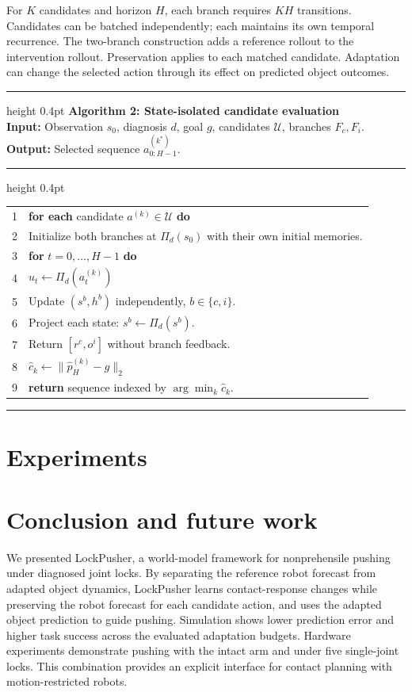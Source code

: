 \documentclass[conference]{IEEEtran}
\begin{document}
For $K$ candidates and horizon $H$, each branch requires $KH$ transitions. Candidates can be batched independently; each maintains its own temporal recurrence. The two-branch construction adds a reference rollout to the intervention rollout. Preservation applies to each matched candidate. Adaptation can change the selected action through its effect on predicted object outcomes.


\par\smallskip\noindent
\begin{minipage}{\linewidth}
\hrule height 0.4pt\smallskip
\textbf{Algorithm 2: State-isolated candidate evaluation}\label{alg:rollout}\\
\textbf{Input:} Observation $s_0$, diagnosis $d$, goal $g$, candidates $\mathcal U$, branches $F_c,F_i$.\\
\textbf{Output:} Selected sequence $a^{(k^*)}_{0:H-1}$.
\smallskip\hrule height 0.4pt\smallskip
\begin{tabular}{@{}r@{\quad}p{.87\linewidth}@{}}
1 & \textbf{for each} candidate $a^{(k)}\in\mathcal U$ \textbf{do}\\
2 & \quad Initialize both branches at $\Pi_d(s_0)$ with their own initial memories.\\
3 & \quad \textbf{for} $t=0,\ldots,H-1$ \textbf{do}\\
4 & \qquad $u_t\leftarrow\Pi_d(a_t^{(k)})$\\
5 & \qquad Update $(s^b,h^b)$ independently, $b\in\{c,i\}$.\\
6 & \qquad Project each state: $s^b\leftarrow\Pi_d(s^b)$.\\
7 & \qquad Return $[r^c,o^i]$ without branch feedback.\\
8 & \quad $\hat c_k\leftarrow\|\hat p_H^{(k)}-g\|_2$\\
9 & \textbf{return} sequence indexed by $\arg\min_k\hat c_k$.
\end{tabular}
\smallskip\hrule
\end{minipage}
\par\smallskip

\section{Experiments}
\label{sec:experiments}



\section{Conclusion and future work}
We presented LockPusher, a world-model framework for nonprehensile pushing under diagnosed joint locks. By separating the reference robot forecast from adapted object dynamics, LockPusher learns contact-response changes while preserving the robot forecast for each candidate action, and uses the adapted object prediction to guide pushing. Simulation shows lower prediction error and higher task success across the evaluated adaptation budgets. Hardware experiments demonstrate pushing with the intact arm and under five single-joint locks. This combination provides an explicit interface for contact planning with motion-restricted robots.
\end{document}

